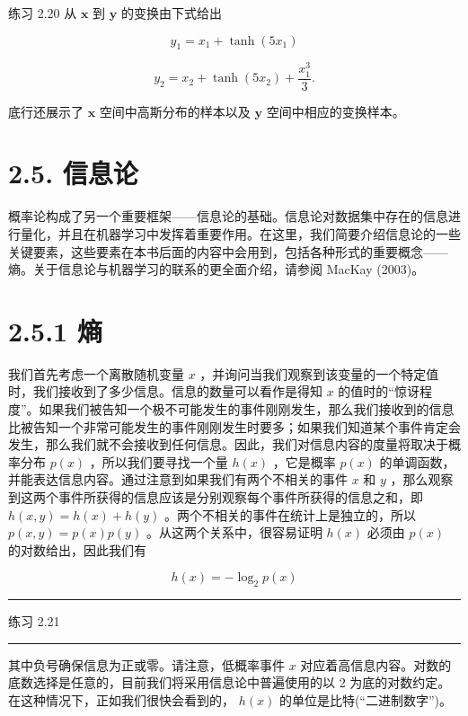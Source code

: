\documentclass[10pt]{report}
\newcommand{\HRule}{\begin{center}\rule{0.9\linewidth}{0.2mm}\end{center}}
\begin{document}
练习 2.20 从 \(\mathbf{x}\) 到 \(\mathbf{y}\) 的变换由下式给出

\[
{y}_{1} = {x}_{1} + \tanh \left( {5{x}_{1}}\right)  \tag{2.78}
\]

\[
{y}_{2} = {x}_{2} + \tanh \left( {5{x}_{2}}\right)  + \frac{{x}_{1}^{3}}{3}. \tag{2.79}
\]

底行还展示了 \(\mathbf{x}\) 空间中高斯分布的样本以及 \(\mathbf{y}\) 空间中相应的变换样本。

\section*{2.5. 信息论}

概率论构成了另一个重要框架——信息论的基础。信息论对数据集中存在的信息进行量化，并且在机器学习中发挥着重要作用。在这里，我们简要介绍信息论的一些关键要素，这些要素在本书后面的内容中会用到，包括各种形式的重要概念——熵。关于信息论与机器学习的联系的更全面介绍，请参阅 MacKay (2003)。

\section*{2.5.1 熵}

我们首先考虑一个离散随机变量 \(x\) ，并询问当我们观察到该变量的一个特定值时，我们接收到了多少信息。信息的数量可以看作是得知 \(x\) 的值时的“惊讶程度”。如果我们被告知一个极不可能发生的事件刚刚发生，那么我们接收到的信息比被告知一个非常可能发生的事件刚刚发生时要多；如果我们知道某个事件肯定会发生，那么我们就不会接收到任何信息。因此，我们对信息内容的度量将取决于概率分布 \(p\left( x\right)\) ，所以我们要寻找一个量 \(h\left( x\right)\) ，它是概率 \(p\left( x\right)\) 的单调函数，并能表达信息内容。通过注意到如果我们有两个不相关的事件 \(x\) 和 \(y\) ，那么观察到这两个事件所获得的信息应该是分别观察每个事件所获得的信息之和，即 \(h\left( {x,y}\right)  = h\left( x\right)  + h\left( y\right)\) 。两个不相关的事件在统计上是独立的，所以 \(p\left( {x,y}\right)  = p\left( x\right) p\left( y\right)\) 。从这两个关系中，很容易证明 \(h\left( x\right)\) 必须由 \(p\left( x\right)\) 的对数给出，因此我们有

\[
h\left( x\right)  =  - {\log }_{2}p\left( x\right)  \tag{2.80}
\]

\HRule

练习 2.21

\HRule

其中负号确保信息为正或零。请注意，低概率事件 \(x\) 对应着高信息内容。对数的底数选择是任意的，目前我们将采用信息论中普遍使用的以 2 为底的对数约定。在这种情况下，正如我们很快会看到的， \(h\left( x\right)\) 的单位是比特(“二进制数字”)。
\end{document}
